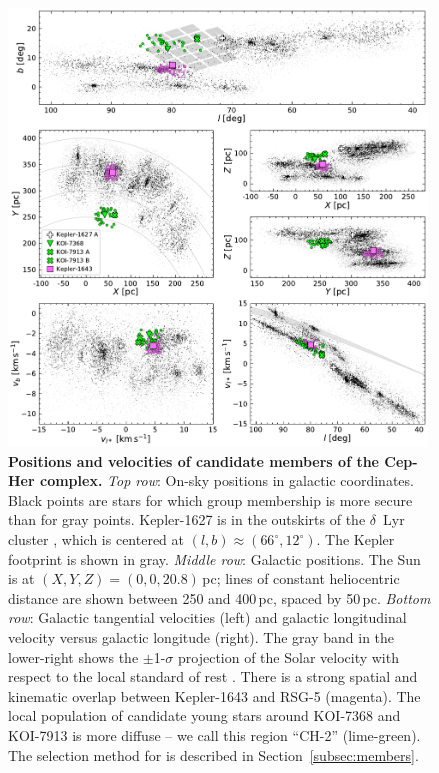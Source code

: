 \documentclass[12pt,twocolumn,tighten,linenumbers]{aastex63}
\begin{document}
\begin{figure}[t]
	\begin{center}
		\leavevmode
		\includegraphics[width=0.99\textwidth]{f1.pdf}
	\end{center}
	\vspace{-0.6cm}
	\caption{
  {\bf Positions and velocities of candidate members of the Cep-Her
  complex.}
  {\it Top row}: On-sky positions in galactic coordinates.  Black
  points are stars for which group membership is more secure than for
  gray points.  Kepler-1627 is in the outskirts of the $\delta$\ Lyr
  cluster \citep{bouma_kep1627_2022}, which is centered at $(l,b)
  \approx (66^\circ, 12^\circ)$.
  The Kepler footprint is shown in gray.
  {\it Middle row}: Galactic positions.  The Sun is at $(X, Y, Z) =
  (0, 0, 20.8)$\,pc; lines of constant heliocentric distance are
  shown between 250 and 400\,pc, spaced by 50\,pc.
  {\it Bottom row}: Galactic tangential velocities (left) and
  galactic longitudinal velocity versus galactic longitude (right).
  The gray band in the lower-right shows the $\pm$1-$\sigma$
  projection of the Solar velocity with respect to the local standard
  of rest \citep{schonrich_local_2010}.  There is a strong spatial and kinematic overlap between
  Kepler-1643 and RSG-5 (magenta).  The local population
  of candidate young stars around KOI-7368 and KOI-7913 is more
  diffuse -- we call this region ``CH-2'' (lime-green).
  The selection method for 
  is described in Section~\ref{subsec:members}.
	\label{fig:XYZvtang}
	}
\end{figure}
\end{document}
